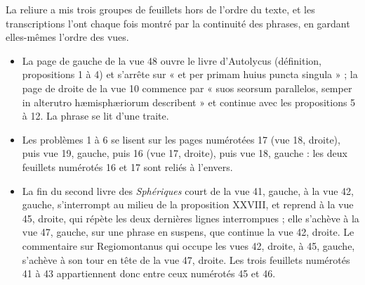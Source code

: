 \documentclass[11pt,a4paper]{article}
\begin{document}
La reliure a mis trois groupes de feuillets hors de l'ordre du texte, et les
transcriptions l'ont chaque fois montré par la continuité des phrases, en
gardant elles-mêmes l'ordre des vues.

\begin{itemize}
  \item La page de gauche de la vue 48 ouvre le livre d'Autolycus
    (définition, propositions 1 à 4) et s'arrête sur « et per primam huius
    puncta singula » ; la page de droite de la vue 10 commence par « suos
    seorsum parallelos, semper in alterutro hæmisphæriorum describent » et
    continue avec les propositions 5 à 12. La phrase se lit d'une traite.
  \item Les problèmes 1 à 6 se lisent sur les pages numérotées 17 (vue 18,
    droite), puis vue 19, gauche, puis 16 (vue 17, droite), puis vue 18,
    gauche : les deux feuillets numérotés 16 et 17 sont reliés à l'envers.
  \item La fin du second livre des \emph{Sphériques} court de la vue 41,
    gauche, à la vue 42, gauche, s'interrompt au milieu de la proposition XXVIII, et reprend
    à la vue 45, droite, qui répète les deux dernières lignes interrompues ; elle
    s'achève à la vue 47, gauche, sur une phrase en suspens, que continue la
    vue 42, droite. Le commentaire sur Regiomontanus qui occupe les vues 42,
    droite, à 45, gauche, s'achève à son tour en tête de la vue 47, droite.
    Les trois feuillets numérotés 41 à 43 appartiennent donc entre ceux
    numérotés 45 et 46.
\end{itemize}
\end{document}
